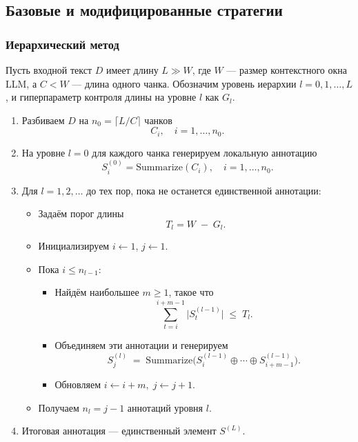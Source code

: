 \documentclass{article}
\theoremstyle{definition}
\theoremstyle{plain}
\begin{document}
\subsection*{Базовые и модифицированные стратегии}

\subsubsection*{Иерархический метод}
Пусть входной текст $D$ имеет длину $L\gg W$, где $W$ — размер контекстного окна LLM, а $C<W$ — длина одного чанка. Обозначим уровень иерархии $l=0,1,\dots,L$, и гиперпараметр контроля длины на уровне $l$ как $G_l$. 

\begin{enumerate}
  \item Разбиваем $D$ на $n_0 = \bigl\lceil L / C\bigr\rceil$ чанков 
  \[
    C_i,\quad i=1,\dots,n_0.
  \]
  \item На уровне $l=0$ для каждого чанка генерируем локальную аннотацию
  \[
    S_i^{(0)} = \mathrm{Summarize}(C_i), 
    \quad i=1,\dots,n_0.
  \]
  \item Для $l=1,2,\dots$ до тех пор, пока не останется единственной аннотации:
  \begin{itemize}
    \item Задаём порог длины  
    \[
      T_l = W \;-\; G_l.
    \]
    \item Инициализируем $i\leftarrow1$, $j\leftarrow1$.
    \item Пока $i \le n_{l-1}$:
      \begin{itemize}
        \item Найдём наибольшее $m\ge1$, такое что
        \[
          \sum_{t=i}^{i+m-1} \bigl|S_t^{(l-1)}\bigr| \;\le\; T_l.
        \]
        \item Объединяем эти аннотации и генерируем
        \[
          S_j^{(l)} \;=\;
          \mathrm{Summarize}\bigl(S_i^{(l-1)}\oplus\cdots\oplus S_{i+m-1}^{(l-1)}\bigr).
        \]
        \item Обновляем $i\leftarrow i+m,\; j\leftarrow j+1$.
      \end{itemize}
    \item Получаем $n_l=j-1$ аннотаций уровня $l$.
  \end{itemize}
  \item Итоговая аннотация — единственный элемент $S^{(L)}$.
\end{enumerate}
\end{document}
